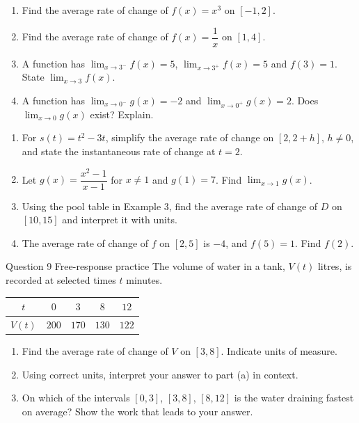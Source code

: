 \documentclass[11pt]{article}
\begin{document}
\newpage
{}

\begin{enumerate}[leftmargin=*,itemsep=2pt]
  \item Find the average rate of change of $f(x)=x^3$ on $[-1,2]$.\work{2.3cm}
  \item Find the average rate of change of $f(x)=\dfrac1x$ on $[1,4]$.\work{2.3cm}
  \item A function has $\displaystyle\lim_{x\to 3^-}f(x)=5$, $\displaystyle\lim_{x\to 3^+}f(x)=5$ and $f(3)=1$. State $\displaystyle\lim_{x\to 3}f(x)$.\work{2.3cm}
  \item A function has $\displaystyle\lim_{x\to 0^-}g(x)=-2$ and $\displaystyle\lim_{x\to 0^+}g(x)=2$. Does $\displaystyle\lim_{x\to 0}g(x)$ exist? Explain.\work{2.3cm}
\end{enumerate}

\begin{enumerate}[leftmargin=*,itemsep=2pt,start=5]
  \item For $s(t)=t^2-3t$, simplify the average rate of change on $[2,2+h]$, $h\neq0$, and state the instantaneous rate of change at $t=2$.\work{2.8cm}
  \item Let $g(x)=\dfrac{x^2-1}{x-1}$ for $x\neq1$ and $g(1)=7$. Find $\displaystyle\lim_{x\to 1}g(x)$.\work{2.8cm}
  \item Using the pool table in Example 3, find the average rate of change of $D$ on $[10,15]$ and interpret it with units.\work{2.8cm}
  \item The average rate of change of $f$ on $[2,5]$ is $-4$, and $f(5)=1$. Find $f(2)$.\work{2.8cm}
\end{enumerate}

\begin{frbox}{Question 9 \textperiodcentered{} Free-response practice}
The volume of water in a tank, $V(t)$ litres, is recorded at selected times $t$ minutes.\begin{center}\renewcommand{\arraystretch}{1.25}\begin{tabular}{|c|c|c|c|c|}\hline $t$ & $0$ & $3$ & $8$ & $12$ \\ \hline $V(t)$ & $200$ & $170$ & $130$ & $122$ \\ \hline\end{tabular}\end{center}
\begin{enumerate}[label=(\alph*),leftmargin=*,itemsep=2pt]
  \item Find the average rate of change of $V$ on $[3,8]$. Indicate units of measure.\work{2.6cm}
  \item Using correct units, interpret your answer to part (a) in context.\work{2.6cm}
  \item On which of the intervals $[0,3]$, $[3,8]$, $[8,12]$ is the water draining fastest on average? Show the work that leads to your answer.\work{2.6cm}
\end{enumerate}
\end{frbox}
\end{document}
